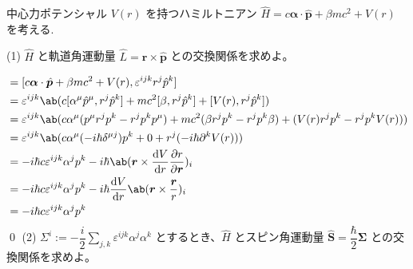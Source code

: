\documentclass[uplatex,dvipdfmx,a4paper,11pt]{jlreq}
\makeatletter
\theoremstyle{definition}
\renewenvironment{proof}[1][\proofname]{\par
  \normalfont
  \topsep6\p@\@plus6\p@ \trivlist
  \item[\hskip\labelsep{\bfseries #1}\@addpunct{\bfseries}]\ignorespaces\quad\par
}{%
  \qed\endtrivlist\@endpefalse
}
\renewcommand\proofname{証明}
\newcommand{\rr}{\bm{r}}
\newcommand{\pp}{\bm{p}}
\numberwithin{equation}{section}
\makeatother
\begin{document}
\begin{problem}
中心力ポテンシャル $V(r)$ を持つハミルトニアン $\hat{H} = c\bm{\alpha}\cdot\hat{\pp} + \beta mc^2 + V(r)$ を考える.
\end{problem}
(1) $\hat{H}$ と軌道角運動量 $\hat{L} = \rr\times\hat{\pp}$ との交換関係を求めよ。
\begin{proof}
  \begin{align}
    [\hat{H}, \hat{L}^i] & = [c\bm{\alpha}\cdot\hat{\pp} + \beta mc^2 + V(r), \varepsilon^{ijk}r^j\hat{p}^k]                                              \\
                         & = \varepsilon^{ijk}\ab(c[\alpha^\mu\hat{p}^\mu, r^j\hat{p}^k] + mc^2[\beta, r^j\hat{p}^k] + [V(r), r^j\hat{p}^k])              \\
                         & = \varepsilon^{ijk}\ab(c\alpha^\mu(p^\mu r^jp^k - r^jp^kp^\mu) + mc^2(\beta r^jp^k - r^jp^k\beta) + (V(r)r^jp^k - r^jp^kV(r))) \\
                         & = \varepsilon^{ijk}\ab(c\alpha^\mu (-i\hbar\delta^{\mu j})p^k + 0 + r^j(-i\hbar\partial^kV(r)))                                \\
                         & = -i\hbar c\varepsilon^{ijk}\alpha^jp^k - i\hbar\ab(\rr\times\diff{V}{r}\diffp{r}{\rr})_i                                      \\
                         & = -i\hbar c\varepsilon^{ijk}\alpha^jp^k - i\hbar\diff{V}{r}\ab(\rr\times\frac{\rr}{r})_i                                       \\
                         & = -i\hbar c\varepsilon^{ijk}\alpha^jp^k
  \end{align}
\end{proof}
(2) $\Sigma^i := -\dfrac{i}{2}\sum_{j,k}\varepsilon^{ijk}\alpha^j\alpha^k$ とするとき、$\hat{H}$ とスピン角運動量 $\hat{\bm{S}} = \dfrac{\hbar}{2}\bm{\Sigma}$ との交換関係を求めよ。
\end{document}
